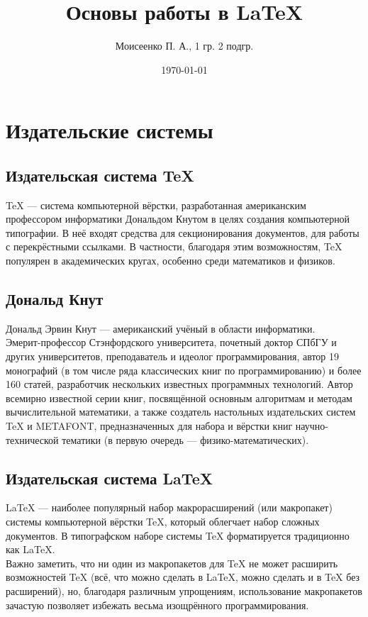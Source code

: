 \documentclass[a4paper,12pt]{article} %
\author{Моисеенко П. А., 1 гр. 2 подгр.}
\title{Основы работы в \LaTeX{}}
\date{\today}
\begin{document}
\maketitle
\newpage
\section{Издательские системы}
\subsection{Издательская система TeX}
TeX --- система компьютерной вёрстки, разработанная американским профессором информатики Дональдом Кнутом в целях создания компьютерной типографии. В неё входят средства для секционирования документов, для работы с перекрёстными ссылками. В частности, благодаря этим возможностям, TeX популярен в академических кругах, особенно среди математиков и физиков.

\subsection{Дональд Кнут}
Дональд Эрвин Кнут --- американский учёный в области информатики.\\
Эмерит-профессор Стэнфордского университета, почетный доктор СПбГУ и других университетов, преподаватель и идеолог программирования, автор 19 монографий (в том числе ряда классических книг по программированию) и более 160 статей, разработчик нескольких известных программных технологий. Автор всемирно известной серии книг, посвящённой основным алгоритмам и методам вычислительной математики, а также создатель настольных издательских систем TeX и METAFONT, предназначенных для набора и вёрстки книг научно-технической тематики (в первую очередь --- физико-математических).

\subsection{Издательская система LaTeX}
LaTeX --- наиболее популярный набор макрорасширений (или макропакет) системы компьютерной вёрстки TeX, который облегчает набор сложных документов. В типографском наборе системы TeX форматируется традиционно как LaTeX.\\
Важно заметить, что ни один из макропакетов для TeX не может расширить возможностей TeX (всё, что можно сделать в LaTeX, можно сделать и в TeX без расширений), но, благодаря различным упрощениям, использование макропакетов зачастую позволяет избежать весьма изощрённого программирования.
\end{document}
